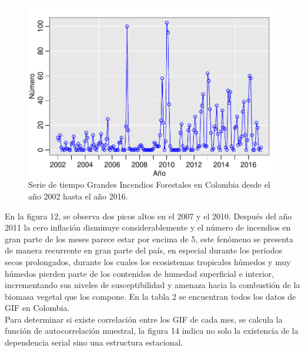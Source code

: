 \documentclass[a4paper]{article}\usepackage[]{graphicx}\usepackage[]{color}
\makeatletter
\def\maxwidth{ %
  \ifdim\Gin@nat@width>\linewidth
    \linewidth
  \else
    \Gin@nat@width
  \fi
}
\newenvironment{knitrout}{}{} %
\makeatother
\begin{document}
\begin{knitrout}
\color{fgcolor}\begin{figure}[h]
\includegraphics[width=\maxwidth]{figure/unnamed-chunk-37-1} \caption[Serie de tiempo Grandes Incendios Forestales en Colombia desde el año 2002 hasta el año 2016]{Serie de tiempo Grandes Incendios Forestales en Colombia desde el año 2002 hasta el año 2016.}\label{fig:unnamed-chunk-37}
\end{figure}


\end{knitrout}

En la figura 12, se observa dos picos altos en el 2007 y el 2010. Después del año 2011 la cero inflación disminuye considerablemente y el número de incendios en gran parte de los meses parece estar por encima de 5, este fenómeno se presenta de manera recurrente en gran parte del país, en especial durante los periodos secos prolongados, durante los cuales los ecosistemas tropicales húmedos y muy húmedos pierden parte de los contenidos de humedad superficial e interior, incrementando sus niveles de susceptibilidad y amenaza hacia la combustión de la biomasa vegetal que los compone. En la tabla 2 se encuentran todos los datos de GIF en Colombia.
\\
Para determinar si existe correlación entre los GIF de cada mes, se calcula la función de autocorrelación muestral, la figura 14 indica no solo la existencia de la dependencia serial sino una estructura estacional.
\end{document}
